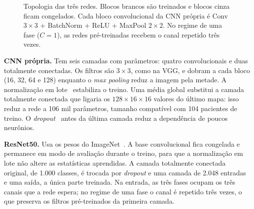 \documentclass[12pt]{article}
\begin{document}
\begin{figure}[ht]
\caption{Topologia das três redes. Blocos brancos são treinados e blocos cinza ficam congelados.
Cada bloco convolucional da CNN própria é Conv $3{\times}3$ + BatchNorm + ReLU + MaxPool $2{\times}2$.
No regime de uma fase ($C=1$), as redes pré-treinadas recebem o canal repetido três vezes.}
\label{fig:topologia}
\end{figure}

\textbf{CNN própria.} Tem seis camadas com parâmetros: quatro convolucionais e duas totalmente
conectadas. Os filtros são $3 \times 3$, como na VGG, e dobram a cada bloco (16, 32, 64 e 128) enquanto o
\textit{max pooling} reduz a imagem pela metade. A normalização em lote~\cite{ioffe2015} estabiliza o
treino. Uma média global substitui a camada totalmente conectada que ligaria os $128 \times 16 \times 16$
valores do último mapa: isso reduz a rede a 106 mil parâmetros, tamanho compatível com 104 pacientes de
treino. O \textit{dropout}~\cite{srivastava2014} antes da última camada reduz a dependência de poucos
neurônios.

\textbf{ResNet50.} Usa os pesos do ImageNet~\cite{he2016,deng2009}. A base convolucional fica congelada e
permanece em modo de avaliação durante o treino, para que a normalização em lote não altere as estatísticas
aprendidas. A camada totalmente conectada original, de 1.000 classes, é trocada por \textit{dropout} e uma
camada de 2.048 entradas e uma saída, a única parte treinada. Na entrada, as três fases ocupam os três
canais que a rede espera; no regime de uma fase o canal é repetido três vezes, o que preserva os filtros
pré-treinados da primeira camada.
\end{document}
